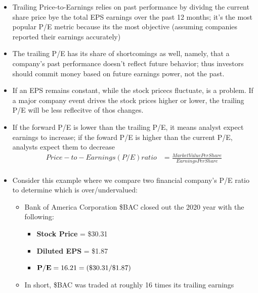 \documentclass{article}
\begin{document}
\begin{itemize}
\begin{itemize}
				\item Trailing Price-to-Earnings relies on past performance by dividng the current share price bye the total EPS earnings over the past 12 months; it's the most popular P/E metric because its the most objective (assuming companies reported their earnings accurately)
				\item The trailing P/E has its share of shortcomings as well, namely, that a company's past performance doesn't reflect future behavior; thus investors should commit money based on future earnings power, not the past.
				\item If an EPS remains constant, while the stock pricecs fluctuate, is a problem. If a major company event drives the stock prices higher or lower, the trailing P/E will be less reflecitve of thos changes.
				\item If the forward P/E is lower than the trailing P/E, it means analyst expect earnings to increase; if the foward P/E is higher than the current P/E, analysts expect them to decrease
				\begin{align*}
					Price-to-Earnings (P/E) ratio &= \frac{Market Value Per Share}{Earnings Per Share}\\
				\end{align*}
				\item Consider this example where we compare two financial company's P/E ratio to determine which is over/undervalued:
					\begin{itemize}
						\item Bank of America Corporation \$BAC closed out the 2020 year with the following:
							\begin{itemize}
								\item {\bf Stock Price} = \$30.31
								\item {\bf Diluted EPS} = \$1.87
								\item ${\bf P/E} = 16.21 = (\$30.31/\$1.87)$
							\end{itemize}
						\item In short, \$BAC was traded at roughly 16 times its trailing earnings
					\end{itemize}
			\end{itemize}
	\end{itemize}
\end{document}
